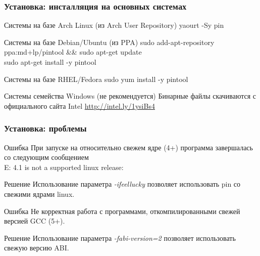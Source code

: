 \documentclass{beamer}
\begin{document}
\begin{frame}
\frametitle{Установка: инсталляция на основных системах}
\begin{block}{Системы на базе Arch Linux (из Arch User Repository)}
yaourt -Sy pin

\end{block}

\begin{block}{Системы на базе Debian/Ubuntu (из PPA)}
sudo add-apt-repository ppa:md+lp/pintool \&\& sudo apt-get update\\
sudo apt-get install -y pintool
\end{block}

\begin{block}{Системы на базе RHEL/Fedora}
sudo yum install -y pintool
\end{block}

\begin{block}{Системы семейства Windows (не рекомендуется)}
Бинарные файлы скачиваются с официального сайта Intel \url{http://intel.ly/1ysiBs4}
\end{block}
\end{frame}


\begin{frame}
\frametitle{Установка: проблемы}

\begin{block}{Ошибка}
При запуске на относительно свежем ядре (4+) программа завершалась со следующим сообщением\\
E: 4.1 is not a supported linux release:
\end{block}

\begin{block}{Решение}
Использование параметра \textit{-ifeellucky} позволяет использовать pin со свежими ядрами linux.
\end{block}

\begin{block}{Ошибка}
Не корректная работа с программами, откомпилированными свежей версией GCC (5+).
\end{block}

\begin{block}{Решение}
Использование параметра \textit{-fabi-version=2} позволяет использовать свежую версию ABI.
\end{block}

\end{frame}
\end{document}
